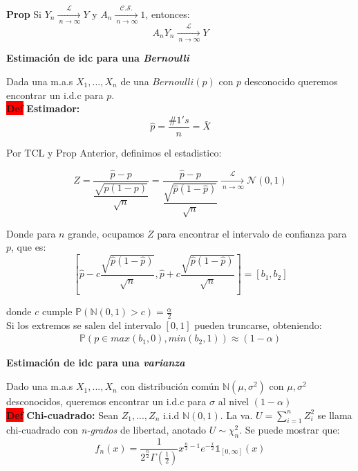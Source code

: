 \documentclass[letterpaper,10.5pt,twocolumn]{article} %
\newcommand{\N}{\mathbb{N} }
\newcommand{\Proba}{\mathbb{P} }
\newcommand{\mas}{X_1, ..., X_n}
\newcommand{\pley}{\xrightarrow[\ n \rightarrow \infty]{ \mathcal{L}}}
\newcommand{\hlc}[2][yellow]{ \colorbox{#1}{#2} }
\newcommand{\Prop}{\hlc[amber]{\bfseries Prop}}
\newcommand{\Def}{\hlc[red]{\bfseries Def}}
\let\oldfrac=\frac
\renewcommand{\frac}[2]{\ensuremath{\oldfrac{#1}{#2}}}
\begin{document}
\Prop Si $Y_n \xrightarrow[\ n \rightarrow \infty]{ \mathcal{L}} Y $ y $A_n \xrightarrow[\ n \rightarrow \infty]{ \mathcal{C.S.}} 1 $, entonces:
\begin{equation*}
	A_n Y_n \xrightarrow[\ n \rightarrow \infty]{ \mathcal{L}} Y
\end{equation*}

\textbf{Estimación de idc para una \textit{Bernoulli}}

Dada una m.a.s $\mas$ de una $Bernoulli(p) $ con $p$ desconocido queremos encontrar un i.d.c para $p$. \\

\Def \textbf{Estimador:}
\begin{equation*}
	\hat{p} = \frac{\# 1's}{n} = \bar{X}
\end{equation*}

Por TCL y Prop Anterior, definimos el estadistico:

\begin{equation*}
	Z = \dfrac{\hat{p} - p}{ \dfrac{\sqrt{ p(1-p)}}{\sqrt{n}}} = \dfrac{\hat{p} - p}{ \dfrac{\sqrt{ \hat{p}(1-\hat{p})}}{\sqrt{n}}}  \pley \mathcal{N} (0,1)
\end{equation*}

Donde para $n$ grande, ocupamos $Z$ para encontrar el intervalo de confianza para $p$, que es:
\begin{equation*}
	\left[\hat{p} - c\dfrac{\sqrt{\hat{p} (1-\hat{p}) }}{\sqrt{n}}, \hat{p} + c\dfrac{\sqrt{\hat{p} (1-\hat{p}) }}{\sqrt{n}} \right] = [b_1,b_2]
\end{equation*}

donde $c$ cumple $\Proba (\N(0,1) > c ) =\frac{\alpha}{2} $\\

Si los extremos se salen del intervalo $[0,1]$ pueden truncarse, obteniendo:
\begin{align*}
	\Proba\left( p \in max\left(b_1, 0 \right), min\left(b_2, 1\right)\right) \approx (1-\alpha)	
\end{align*}


\textbf{Estimación de idc para una \textit{varianza}}

Dado una m.a.s $\mas$ con distribución común $\N(\mu,\sigma^2) $ con $\mu,\sigma^2 $ desconocidos, queremos encontrar un i.d.c para $\sigma$ al nivel $(1-\alpha)$\\

\Def \textbf{Chi-cuadrado:}
Sean $Z_1,..., Z_n $ i.i.d $\N(0,1)$. La va. $U=\sum_{i=1}^{n} Z_i^2 $ se llama chi-cuadrado con \textit{n-grados} de libertad, anotado $U\sim \chi_n^2 $. Se puede mostrar que:
\begin{equation*}
	f_n (x) = \dfrac{1}{2^{\frac{n}{2}} \Gamma (\frac{1}{2})} x^{\frac{n}{2} -1} e^{-\frac{x}{2}} \mathds{1}_{[0,\infty]} (x) 
\end{equation*}
\end{document}
